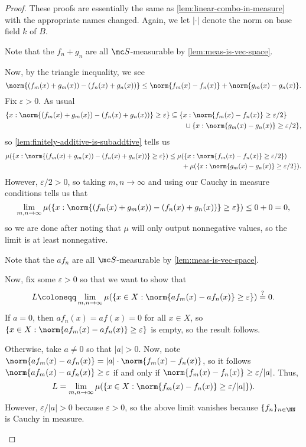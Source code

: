 \documentclass[../notes.tex]{subfiles}
\begin{document}
\begin{proof}
	These proofs are essentially the same as \autoref{lem:linear-combo-in-measure} with the appropriate names changed. Again, we let $|\cdot|$ denote the norm on base field $k$ of $B$.
	\begin{listalph}
		\item Note that the $f_n+g_n$ are all $\mc S$-measurable by \autoref{lem:meas-is-vec-space}.
		
		Now, by the triangle inequality, we see
		\[\norm{(f_m(x)+g_m(x))-(f_n(x)+g_n(x))}\le\norm{f_m(x)-f_n(x)}+\norm{g_m(x)-g_n(x)}.\]
		Fix $\varepsilon>0$. As usual
		\begin{align*}
			\{x:\norm{(f_m(x)+g_m(x))-(f_n(x)+g_n(x))}\ge\varepsilon\}&\subseteq\{x:\norm{f_m(x)-f_n(x)}\ge\varepsilon/2\} \\
			&\qquad\cup\{x:\norm{g_m(x)-g_n(x)}\ge\varepsilon/2\},
		\end{align*}
		so \autoref{lem:finitely-additive-is-subaddtive} tells us
		\begin{align*}
			\mu(\{x:\norm{(f_m(x)+g_m(x))-(f_n(x)+g_n(x))}\ge\varepsilon\}) &\le \mu(\{x:\norm{f_m(x)-f_n(x)}\ge\varepsilon/2\}) \\
			&\qquad+\mu(\{x:\norm{g_m(x)-g_n(x)}\ge\varepsilon/2\}).
		\end{align*}
		However, $\varepsilon/2>0$, so taking $m,n\to\infty$ and using our Cauchy in measure conditions tells us that
		\[\lim_{m,n\to\infty}\mu(\{x:\norm{(f_m(x)+g_m(x))-(f_n(x)+g_n(x))}\ge\varepsilon\})\le0+0=0,\]
		so we are done after noting that $\mu$ will only output nonnegative values, so the limit is at least nonnegative.

		\item Note that the $af_n$ are all $\mc S$-measurable by \autoref{lem:meas-is-vec-space}.
		
		Now, fix some $\varepsilon>0$ so that we want to show that
		\[L\coloneqq\lim_{m,n\to\infty}\mu(\{x\in X:\norm{af_m(x)-af_n(x)}\ge\varepsilon\})\stackrel?=0.\]
		If $a=0$, then $af_n(x)=af(x)=0$ for all $x\in X$, so $\{x\in X:\norm{af_m(x)-af_n(x)}\ge\varepsilon\}$ is empty, so the result follows.

		Otherwise, take $a\ne0$ so that $|a|>0$. Now, note $\norm{af_m(x)-af_n(x)}=|a|\cdot\norm{f_m(x)-f_n(x)}$, so it follows $\norm{af_m(x)-af_n(x)}\ge\varepsilon$ if and only if $\norm{f_m(x)-f_n(x)}\ge\varepsilon/|a|$. Thus,
		\[L=\lim_{m,n\to\infty}\mu(\{x\in X:\norm{f_m(x)-f_n(x)}\ge\varepsilon/|a|\}).\]
		However, $\varepsilon/|a|>0$ because $\varepsilon>0$, so the above limit vanishes because $\{f_n\}_{n\in\NN}$ is Cauchy in measure.


\end{listalph}
\end{proof}
\end{document}

